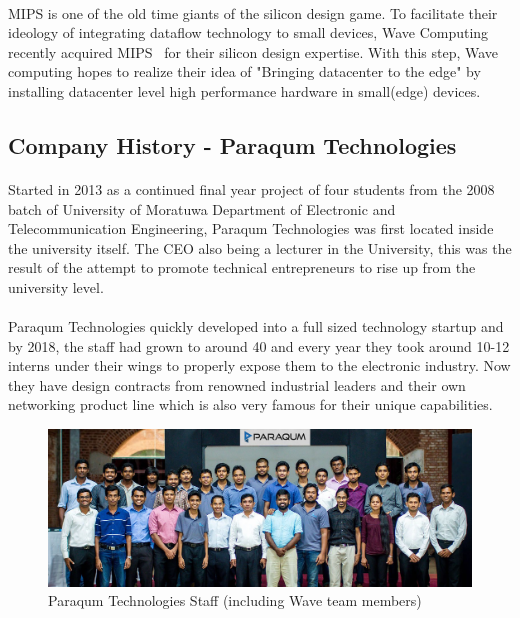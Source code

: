 \paragraph{}
MIPS is one of the old time giants of the silicon design game. To facilitate their ideology of integrating dataflow technology to small devices, Wave Computing recently acquired MIPS~\cite{mipsaq} for their silicon design expertise. With this step, Wave computing hopes to realize their idea of "Bringing datacenter to the edge" by installing datacenter level high performance hardware in small(edge) devices.

\subsection{Company History - Paraqum Technologies}
\paragraph{}
Started in 2013 as a continued final year project of four students from the 2008 batch of University of Moratuwa Department of Electronic and Telecommunication Engineering, Paraqum Technologies was first located inside the university itself. The CEO also being a lecturer in the University, this was the result of the attempt to promote technical entrepreneurs to rise up from the university level.

\paragraph{}
Paraqum Technologies quickly developed into a full sized technology startup and by 2018, the staff had grown to around 40 and every year they took around 10-12 interns under their wings to properly expose them to the electronic industry. Now they have design contracts from renowned industrial leaders and their own networking product line which is also very famous for their unique capabilities.

\begin{figure}[h]
    \centering
    \includegraphics[trim=0cm 0cm 0cm 0cm, clip=true,scale=0.25]{figures/paraqum_team.jpg}
    \caption{Paraqum Technologies Staff (including Wave team members)~\cite{pqmintro} \label{Fig:pqmteam}}\vspace{-4mm}
    \end{figure}

